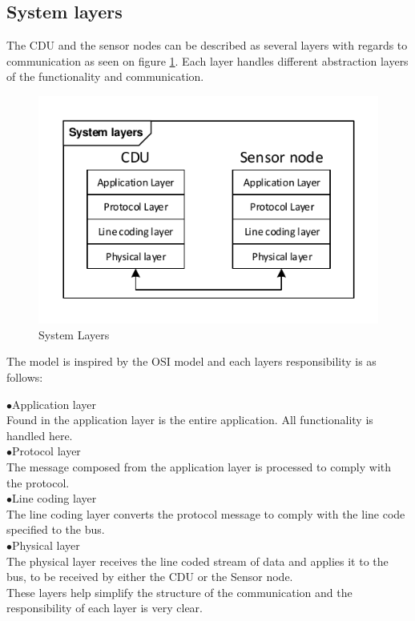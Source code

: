 \subsection{System layers}
The CDU and the sensor nodes can be described as several layers with regards to communication as seen on figure \ref{fig:systemlayers}. Each layer handles different abstraction layers of the functionality and communication. 
\begin{figure}[H]
	\centering
	\includegraphics[width=.6\textwidth]{billeder/11ProjectDescription/System_Layers}
	\caption{System Layers}
	\label{fig:systemlayers}
\end{figure}
The model is inspired by the OSI model\citep{WikipediaOSI} and each layers responsibility is as follows:

\hspace*{.6cm}$\bullet$Application layer\\
Found in the application layer is the entire application. All functionality is handled here.\\
\hspace*{.6cm}$\bullet$Protocol layer\\
The message composed from the application layer is processed to comply with the protocol.\\
\hspace*{.6cm}$\bullet$Line coding layer\\
The line coding layer converts the protocol message to comply with the line code specified to the bus.\\
\hspace*{.6cm}$\bullet$Physical layer\\
The physical layer receives the line coded stream of data and applies it to the bus, to be received by either the CDU or the Sensor node.\\

These layers help simplify the structure of the communication and the responsibility of each layer is very clear.
